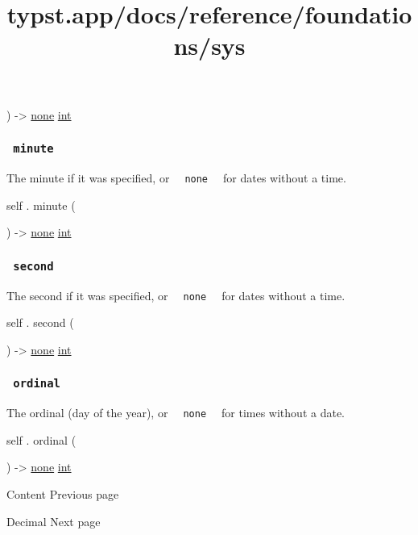 ) -\textgreater{} \href{/docs/reference/foundations/none/}{none}
\href{/docs/reference/foundations/int/}{int}

\subsubsection{\texorpdfstring{\texttt{\ minute\ }}{ minute }}\label{definitions-minute}

The minute if it was specified, or
\texttt{\ }{\texttt{\ none\ }}\texttt{\ } for dates without a time.

self { . } { minute } (

) -\textgreater{} \href{/docs/reference/foundations/none/}{none}
\href{/docs/reference/foundations/int/}{int}

\subsubsection{\texorpdfstring{\texttt{\ second\ }}{ second }}\label{definitions-second}

The second if it was specified, or
\texttt{\ }{\texttt{\ none\ }}\texttt{\ } for dates without a time.

self { . } { second } (

) -\textgreater{} \href{/docs/reference/foundations/none/}{none}
\href{/docs/reference/foundations/int/}{int}

\subsubsection{\texorpdfstring{\texttt{\ ordinal\ }}{ ordinal }}\label{definitions-ordinal}

The ordinal (day of the year), or
\texttt{\ }{\texttt{\ none\ }}\texttt{\ } for times without a date.

self { . } { ordinal } (

) -\textgreater{} \href{/docs/reference/foundations/none/}{none}
\href{/docs/reference/foundations/int/}{int}

\href{/docs/reference/foundations/content/}{\pandocbounded{}}

{ Content } { Previous page }

\href{/docs/reference/foundations/decimal/}{\pandocbounded{}}

{ Decimal } { Next page }


\title{typst.app/docs/reference/foundations/sys}

